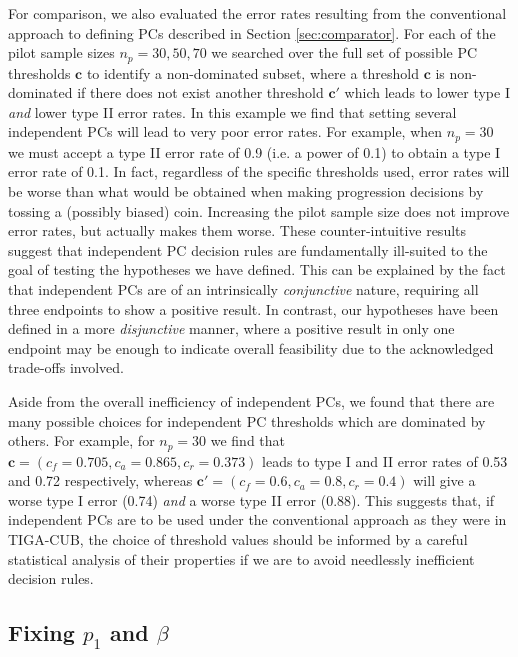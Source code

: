 \documentclass[AMA,STIX1COL]{WileyNJD-v2}
\begin{document}
For comparison, we also evaluated the error rates resulting from the conventional approach to defining PCs described in Section \ref{sec:comparator}. For each of the pilot sample sizes $n_p = 30, 50, 70$ we searched over the full set of possible PC thresholds $\mathbf{c}$ to identify a non-dominated subset, where a threshold $\mathbf{c}$ is non-dominated if there does not exist another threshold $\mathbf{c}'$ which leads to lower type I \emph{and} lower type II error rates. In this example we find that setting several independent PCs will lead to very poor error rates. For example, when $n_p = 30$  we must accept a type II error rate of 0.9 (i.e. a power of 0.1) to obtain a type I error rate of 0.1. In fact, regardless of the specific thresholds used, error rates will be worse than what would be obtained when making progression decisions by tossing a (possibly biased) coin. Increasing the pilot sample size does not improve error rates, but actually makes them worse. These counter-intuitive results suggest that independent PC decision rules are fundamentally ill-suited to the goal of testing the hypotheses we have defined. This can be explained by the fact that independent PCs are of an intrinsically \emph{conjunctive} nature, requiring all three endpoints to show a positive result. In contrast, our hypotheses have been defined in a more \emph{disjunctive} manner, where a positive result in only one endpoint may be enough to indicate overall feasibility due to the acknowledged trade-offs involved. 


Aside from the overall inefficiency of independent PCs, we found that there are many possible choices for independent PC thresholds which are dominated by others. For example, for $n_p = 30$ we find that $\mathbf{c} = (c_f=0.705, c_a=0.865, c_r=0.373)$ leads to type I and II error rates of 0.53 and 0.72 respectively, whereas $\mathbf{c}' = (c_f=0.6, c_a=0.8, c_r=0.4)$ will give a worse type I error (0.74) \emph{and} a worse type II error (0.88). This suggests that, if independent PCs are to be used under the conventional approach as they were in TIGA-CUB, the choice of threshold values should be informed by a careful statistical analysis of their properties if we are to avoid needlessly inefficient decision rules. 

\subsection{Fixing $p_1$ and $\beta$}
\end{document}
